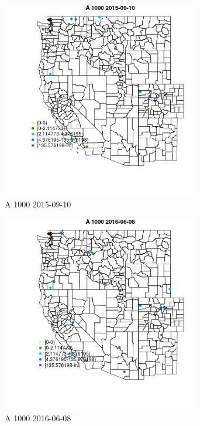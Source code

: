 \begin{figure} 
\centering  
\includegraphics[width=0.77\textwidth]{Code_Outputs/Report_ML_input_PM25_Step4_part_e_de_duplicated_aves_MapObsA_10002015-09-10.jpg} 
\caption{\label{fig:Report_ML_input_PM25_Step4_part_e_de_duplicated_avesMapObsA_10002015-09-10}A 1000 2015-09-10} 
\end{figure} 
 

\begin{figure} 
\centering  
\includegraphics[width=0.77\textwidth]{Code_Outputs/Report_ML_input_PM25_Step4_part_e_de_duplicated_aves_MapObsA_10002016-06-08.jpg} 
\caption{\label{fig:Report_ML_input_PM25_Step4_part_e_de_duplicated_avesMapObsA_10002016-06-08}A 1000 2016-06-08} 
\end{figure} 
 

